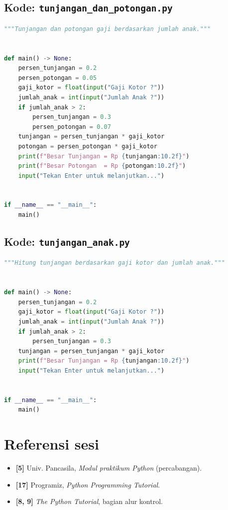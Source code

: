 ﻿\documentclass[../main.tex]{subfiles}
\begin{document}
\subsection{Kode: \texttt{tunjangan\_dan\_potongan.py}}
\begin{lstlisting}[language=Python,caption={\texttt{tunjangan\_dan\_potongan.py}}]
"""Tunjangan dan potongan gaji berdasarkan jumlah anak."""


def main() -> None:
    persen_tunjangan = 0.2
    persen_potongan = 0.05
    gaji_kotor = float(input("Gaji Kotor ?"))
    jumlah_anak = int(input("Jumlah Anak ?"))
    if jumlah_anak > 2:
        persen_tunjangan = 0.3
        persen_potongan = 0.07
    tunjangan = persen_tunjangan * gaji_kotor
    potongan = persen_potongan * gaji_kotor
    print(f"Besar Tunjangan = Rp {tunjangan:10.2f}")
    print(f"Besar Potongan  = Rp {potongan:10.2f}")
    input("Tekan Enter untuk melanjutkan...")


if __name__ == "__main__":
    main()
\end{lstlisting}

\subsection{Kode: \texttt{tunjangan\_anak.py}}
\begin{lstlisting}[language=Python,caption={\texttt{tunjangan\_anak.py}}]
"""Hitung tunjangan berdasarkan gaji kotor dan jumlah anak."""


def main() -> None:
    persen_tunjangan = 0.2
    gaji_kotor = float(input("Gaji Kotor ?"))
    jumlah_anak = int(input("Jumlah Anak ?"))
    if jumlah_anak > 2:
        persen_tunjangan = 0.3
    tunjangan = persen_tunjangan * gaji_kotor
    print(f"Besar Tunjangan = Rp {tunjangan:10.2f}")
    input("Tekan Enter untuk melanjutkan...")


if __name__ == "__main__":
    main()
\end{lstlisting}

\section{Referensi sesi}

\begin{itemize}[leftmargin=*]
  \item \textbf{[5]} Univ. Pancasila, \textit{Modul praktikum Python} (percabangan).
  \item \textbf{[17]} Programiz, \textit{Python Programming Tutorial}.
  \item \textbf{[8, 9]} \textit{The Python Tutorial}, bagian alur kontrol.
\end{itemize}
\end{document}

